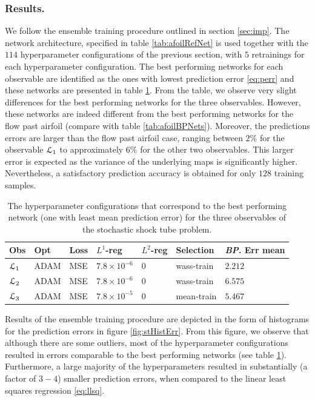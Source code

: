 \documentclass[a4paper]{article}
\numberwithin{equation}{section}
\numberwithin{equation}{section}
\theoremstyle{definition}
\theoremstyle{myremarkstyle}
\newcommand{\map}{\EuScript{L}}
\begin{document}
\subsubsection{Results.}
We follow the ensemble training procedure outlined in section \ref{sec:imp}. The network architecture, specified in table \ref{tab:afoilRefNet} is used together with the $114$ hyperparameter configurations of the previous section, with $5$ retrainings for each hyperparameter configuration. The best performing networks for each observable are identified as the ones with lowest prediction error \eqref{eq:perr} and these networks are presented in table \ref{tab:stBPNets}. From the table, we observe very slight differences for the best performing networks for the three observables. However, these networks are indeed different from the best performing networks for the flow past airfoil (compare with table \ref{tab:afoilBPNets}). Moreover, the predictions errors are larger than the flow past airfoil case, ranging between $2\%$ for the observable $\map_1$ to approximately $6\%$ for the other two observables. This larger error is expected as the variance of the underlying maps is significantly higher. Nevertheless, a satisfactory prediction accuracy is obtained for only $128$ training samples. 
\begin{table}[htbp]
\centering
\begin{tabular}{|l|l|l|l|l|l|l|}
\hline
Obs & Opt & Loss & $L^1$-reg & $L^2$-reg & Selection & \emph{BP}. Err mean  \\
\hline
$\map_1$ & ADAM & MSE & $7.8\times 10^{-6}$ & $0$ & wass-train & $2.212$ \\
\hline
$\map_2$ & ADAM & MSE & $7.8 \times 10^{-6}$ & $0$ & wass-train & $6.575$  \\
\hline 
$\map_3$ & ADAM & MSE & $7.8 \times 10^{-5}$ & $0$ & mean-train & $5.467$  \\
\hline
\end{tabular}
\caption{The hyperparameter configurations that correspond to the best performing network (one with least mean prediction error) for the three observables of the stochastic shock tube problem.}
\label{tab:stBPNets}
\end{table}
Results of the ensemble training procedure are depicted in the form of histograms for the prediction errors in figure \ref{fig:stHistErr}. From this figure, we observe that although there are some outliers, most of the hyperparameter configurations resulted in errors comparable to the best performing networks (see table \ref{tab:stBPNets}). Furthermore, a large majority of the hyperparameters resulted in substantially (a factor of $3-4$) smaller prediction errors, when compared to the linear least squares regression \eqref{eq:llsq}. 
\end{document}
